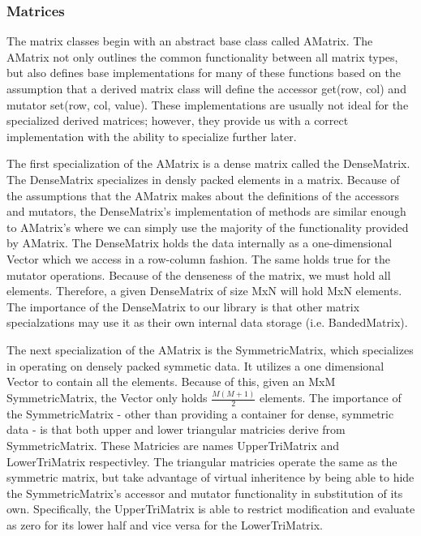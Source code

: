 \documentclass[]{aiaa-tc}%
\begin{document}
\FloatBarrier\subsubsection{Matrices}
The matrix classes begin with an abstract base class called AMatrix. The AMatrix
not only outlines the common functionality between all matrix types, but also defines
base implementations for many of these functions based on the assumption that a derived
matrix class will define the accessor get(row, col) and mutator set(row, col, value).
These implementations are usually not ideal for the specialized derived matrices;
however, they provide us with a correct implementation with the ability to specialize
further later.

The first specialization of the AMatrix is a dense matrix called the DenseMatrix.
The DenseMatrix specializes in densly packed elements in a matrix. Because of the
assumptions that the AMatrix makes about the definitions of the accessors and mutators,
the DenseMatrix's implementation of methods are similar enough to AMatrix's where
we can simply use the majority of the functionality provided by AMatrix.
The DenseMatrix holds the data internally as a one-dimensional Vector which we access
in a row-column fashion. The same holds true for the mutator operations. Because of the denseness of the matrix, we must hold all elements. Therefore, a given DenseMatrix of size MxN will hold MxN elements. The importance  of the DenseMatrix to our library is that other matrix specialzations may use it as their own internal data storage (i.e. BandedMatrix).

The next specialization of the AMatrix is the SymmetricMatrix, which specializes
in operating on densely packed symmetic data. It utilizes a one dimensional Vector to contain all the elements. Because of this, given an MxM SymmetricMatrix, the Vector only holds $\frac{M(M+1)}{2}$ elements. The importance of the SymmetricMatrix - other than providing a container for dense, symmetric data - is that both upper and lower triangular matricies derive from SymmetricMatrix. These Matricies are names UpperTriMatrix and LowerTriMatrix respectivley. The triangular matricies operate the same as the symmetric matrix, but take advantage of virtual inheritence by being able to hide the SymmetricMatrix's accessor and mutator functionality in substitution of its own. Specifically, the UpperTriMatrix is able to restrict modification and evaluate as zero for its lower half and vice versa for the LowerTriMatrix.
\end{document}
